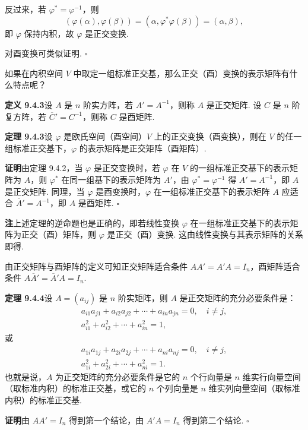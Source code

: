 \documentclass[UTF8, 12pt, fontset=fandol, oneside]{ctexart}
\begin{document}
反过来，若 $\varphi^*=\varphi^{-1}$，则
\[
  (\varphi(\alpha),\varphi(\beta))=(\alpha,\varphi^*\varphi(\beta))=(\alpha,\beta),
\]
即 $\varphi$ 保持内积，故 $\varphi$ 是正交变换.

对酉变换可类似证明. $\square$

如果在内积空间 $V$ 中取定一组标准正交基，那么正交（酉）变换的表示矩阵有什么特点呢？

\noindent\textbf{定义 9.4.3}\quad 设 $A$ 是 $n$ 阶实方阵，若 $A'=A^{-1}$，则称 $A$ 是正交矩阵. 设 $C$ 是 $n$ 阶复方阵，若 $\overline C'=C^{-1}$，则称 $C$ 是酉矩阵.

\noindent\textbf{定理 9.4.3}\quad 设 $\varphi$ 是欧氏空间（酉空间）$V$ 上的正交变换（酉变换），则在 $V$ 的任一组标准正交基下，$\varphi$ 的表示矩阵是正交矩阵（酉矩阵）.

\noindent\textbf{证明}\quad 由定理 9.4.2，当 $\varphi$ 是正交变换时，若 $\varphi$ 在 $V$ 的一组标准正交基下的表示矩阵为 $A$，则 $\varphi^*$ 在同一组基下的表示矩阵为 $A'$，由 $\varphi^*=\varphi^{-1}$ 得 $A'=A^{-1}$，即 $A$ 是正交矩阵. 同理，当 $\varphi$ 是酉变换时，$\varphi$ 在一组标准正交基下的表示矩阵 $A$ 应适合 $\overline A'=A^{-1}$，即 $A$ 是酉矩阵. $\square$

\noindent\textbf{注}\quad 上述定理的逆命题也是正确的，即若线性变换 $\varphi$ 在一组标准正交基下的表示矩阵为正交（酉）矩阵，则 $\varphi$ 是正交（酉）变换. 这由线性变换与其表示矩阵的关系即得.

由正交矩阵与酉矩阵的定义可知正交矩阵适合条件 $AA'=A'A=I_n$，酉矩阵适合条件 $A\overline A'=\overline A'A=I_n$.

\noindent\textbf{定理 9.4.4}\quad 设 $A=(a_{ij})$ 是 $n$ 阶实矩阵，则 $A$ 是正交矩阵的充分必要条件是：
\[
\begin{gathered}
  a_{i1}a_{j1}+a_{i2}a_{j2}+\cdots+a_{in}a_{jn}=0,\quad i\ne j,\\
  a_{i1}^2+a_{i2}^2+\cdots+a_{in}^2=1,
\end{gathered}
\]
或
\[
\begin{gathered}
  a_{1i}a_{1j}+a_{2i}a_{2j}+\cdots+a_{ni}a_{nj}=0,\quad i\ne j,\\
  a_{1i}^2+a_{2i}^2+\cdots+a_{ni}^2=1.
\end{gathered}
\]
也就是说，$A$ 为正交矩阵的充分必要条件是它的 $n$ 个行向量是 $n$ 维实行向量空间（取标准内积）的标准正交基，或它的 $n$ 个列向量是 $n$ 维实列向量空间（取标准内积）的标准正交基.

\noindent\textbf{证明}\quad 由 $AA'=I_n$ 得到第一个结论，由 $A'A=I_n$ 得到第二个结论. $\square$
\end{document}
